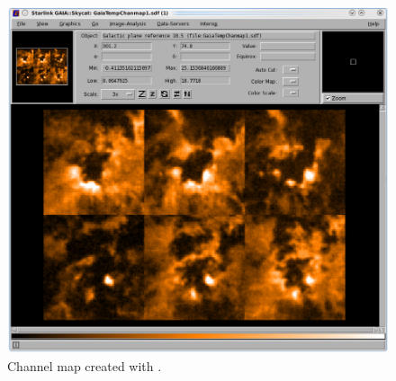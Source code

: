 \documentclass[11pt,oneside,chapters]{starlink}
\begin{document}
\begin{enumerate}[label=(\textbf{\arabic*})]
\begin{figure}[t!]
\begin{center}
\includegraphics[width=0.6\linewidth]{sc20_gaia_channel2}
\caption[Channel map created with \gaia.]{\label{fig:gaia_chan2}
  Channel map created with \gaia.}
\end{center}
\end{figure}
\end{enumerate}
\end{document}
